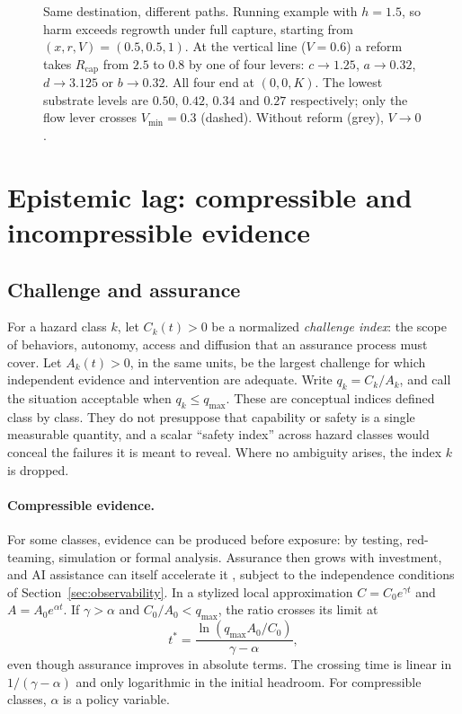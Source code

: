\documentclass[11pt]{article}
\theoremstyle{plain}
\theoremstyle{definition}
\newcommand{\Rcap}{R_{\mathrm{cap}}}
\newcommand{\Vmin}{V_{\min}}
\newcommand{\qmax}{q_{\max}}
\begin{document}
\begin{figure}[t]
\centering

\caption{Same destination, different paths. Running example with $h=1.5$, so harm exceeds regrowth under full capture, starting from $(x,r,V)=(0.5,0.5,1)$. At the vertical line ($V=0.6$) a reform takes $\Rcap$ from $2.5$ to $0.8$ by one of four levers: $c\to1.25$, $a\to0.32$, $d\to3.125$ or $b\to0.32$. All four end at $(0,0,K)$. The lowest substrate levels are $0.50$, $0.42$, $0.34$ and $0.27$ respectively; only the flow lever crosses $\Vmin=0.3$ (dashed). Without reform (grey), $V\to0$.}
\label{fig:levers}
\end{figure}

\section{Epistemic lag: compressible and incompressible evidence}\label{sec:lag}

\subsection{Challenge and assurance}

For a hazard class $k$, let $C_k(t)>0$ be a normalized \emph{challenge index}: the scope of behaviors, autonomy, access and diffusion that an assurance process must cover. Let $A_k(t)>0$, in the same units, be the largest challenge for which independent evidence and intervention are adequate. Write $q_k=C_k/A_k$, and call the situation acceptable when $q_k\le\qmax$. These are conceptual indices defined class by class. They do not presuppose that capability or safety is a single measurable quantity, and a scalar ``safety index'' across hazard classes would conceal the failures it is meant to reveal. Where no ambiguity arises, the index $k$ is dropped.

\paragraph{Compressible evidence.} For some classes, evidence can be produced before exposure: by testing, red-teaming, simulation or formal analysis. Assurance then grows with investment, and AI assistance can itself accelerate it \citep{perez2022}, subject to the independence conditions of Section~\ref{sec:observability}. In a stylized local approximation $C=C_0e^{\gamma t}$ and $A=A_0e^{\alpha t}$. If $\gamma>\alpha$ and $C_0/A_0<\qmax$, the ratio crosses its limit at
\begin{equation}\label{eq:crossing}
t^\ast=\frac{\ln(\qmax A_0/C_0)}{\gamma-\alpha},
\end{equation}
even though assurance improves in absolute terms. The crossing time is linear in $1/(\gamma-\alpha)$ and only logarithmic in the initial headroom. For compressible classes, $\alpha$ is a policy variable.
\end{document}
